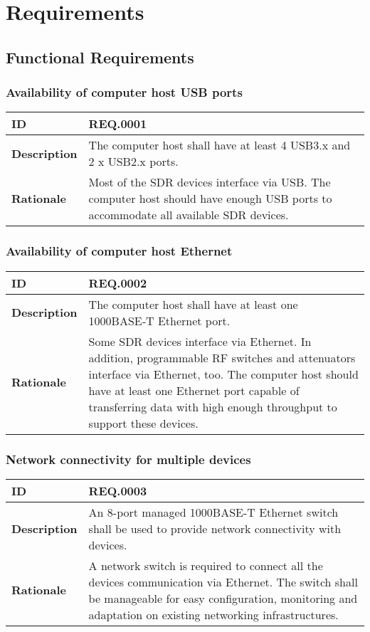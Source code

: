 \documentclass[english,titlepage,a4paper]{report}
\begin{document}
\chapter{Requirements} \label{chapter_4}
\section{Functional Requirements}

\subsection{Availability of computer host USB ports}
\begin{tabular}{|l|p{9cm}|}
  \hline
  \textbf{ID} & REQ.0001 \\
  \hline
  \textbf{Description} &
  The computer host shall have at least 4 USB3.x and 2 x USB2.x ports.
  \\
  \hline
  \textbf{Rationale} &
  Most of the SDR devices interface via USB.
  The computer host should have enough USB ports to accommodate all available SDR devices.
  \\
  \hline
\end{tabular}

\subsection{Availability of computer host Ethernet}
\begin{tabular}{|l|p{9cm}|}
  \hline
  \textbf{ID} & REQ.0002 \\
  \hline
  \textbf{Description} &
  The computer host shall have at least one 1000BASE‑T Ethernet port.
  \\
  \hline
  \textbf{Rationale} &
  Some SDR devices interface via Ethernet.
  In addition, programmable RF switches and attenuators interface via Ethernet, too.
  The computer host should have at least one Ethernet port capable of transferring data with high enough throughput to support these devices.
  \\
  \hline
\end{tabular}

\subsection{Network connectivity for multiple devices}
\begin{tabular}{|l|p{9cm}|}
  \hline
  \textbf{ID} & REQ.0003 \\
  \hline
  \textbf{Description} &
  An 8-port managed 1000BASE-T Ethernet switch shall be used to provide network connectivity with devices.
  \\
  \hline
  \textbf{Rationale} &
  A network switch is required to connect all the devices communication via Ethernet.
  The switch shall be manageable for easy configuration, monitoring and adaptation on existing networking infrastructures.
  \\
  \hline
\end{tabular}
\end{document}
